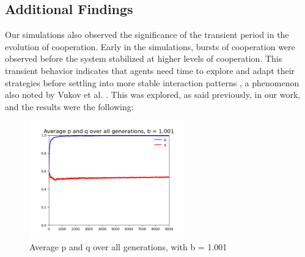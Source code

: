 \documentclass[runningheads]{llncs}
\begin{document}
\subsection{Additional Findings}
Our simulations also observed the significance of the transient period in the evolution
of cooperation. Early in the simulations, bursts of cooperation were observed
before the system stabilized at higher levels of cooperation.
This transient behavior indicates that agents need time to explore and
adapt their strategies before settling into more stable interaction patterns
, a phenomenon also noted by Vukov et al. \cite{vukov}.
This was explored, as said previously, in our work, and the results were the following:
\begin{figure}[H]
    \centering
    \includegraphics[width=0.6\textwidth]{avg_p_q_b-1.001.png}
    \caption{Average p and q over all generations, with b = 1.001}
    \label{fig:avg_p_q_b-1.001}
\end{figure}
\end{document}
